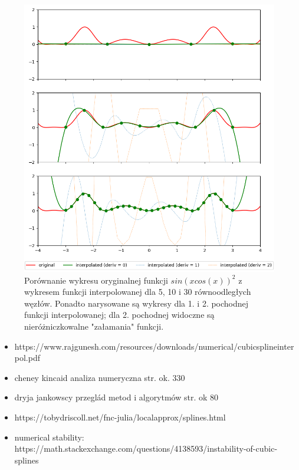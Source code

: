 \documentclass{article}
\begin{document}
\begin{figure}[htbp]
    \center
    \includegraphics[width=1.0\textwidth]{assets/plots_wide.png}
    \caption{Porównanie wykresu oryginalnej funkcji $sin(xcos(x))^2$ z wykresem funkcji interpolowanej dla 5, 10 i 30 równoodległych węzłów. Ponadto narysowane są wykresy dla 1. i 2. pochodnej funkcji interpolowanej; dla 2. pochodnej widoczne są nieróżniczkowalne "załamania" funkcji.}
\end{figure}


\newpage






\begin{itemize}
    \item https://www.rajgunesh.com/resources/downloads/numerical/cubicsplineinterpol.pdf
    \item cheney kincaid analiza numeryczna str. ok. 330 
    \item dryja jankowscy przeglád metod i algorytmów str. ok 80
    \item https://tobydriscoll.net/fnc-julia/localapprox/splines.html
    \item numerical stability: https://math.stackexchange.com/questions/4138593/instability-of-cubic-splines
\end{itemize}
\end{document}
